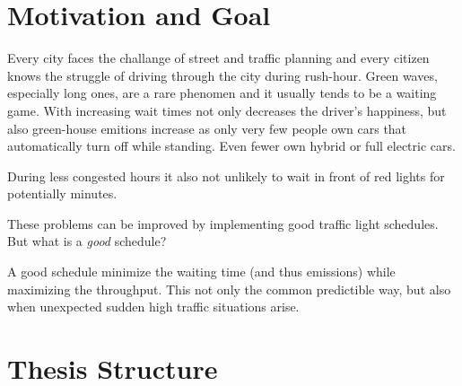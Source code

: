 \section{Motivation and Goal}

Every city faces the challange of street and traffic planning and every citizen knows the struggle of driving through the city during rush-hour. Green waves, especially long ones, are a rare phenomen and it usually tends to be a waiting game.
With increasing wait times not only decreases the driver's happiness, but also green-house emitions increase as only very few people own cars that automatically turn off while standing. Even fewer own hybrid or full electric cars.

During less congested hours it also not unlikely to wait in front of red lights for potentially minutes.

These problems can be improved by implementing good traffic light schedules. But what is a \emph{good} schedule?

A good schedule minimize the waiting time (and thus emissions) while maximizing the throughput. This not only the common predictible way, but also when unexpected sudden high traffic situations arise.

\section{Thesis Structure}

